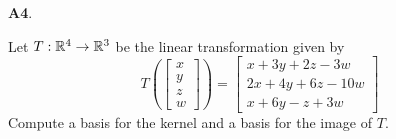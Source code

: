 \documentclass{article}
\newenvironment{problem}[1]
{
  \begin{flushleft}
  \textbf{#1}.
  \ignorespaces
}
{
  \end{flushleft}
}
\newenvironment{solution}
{
  \ignorespaces
  \textbf{Solution:}
}
{
  \ignorespacesafterend
  \begin{flushright}
  {\bfseries \qed}
  \end{flushright}
}
\begin{document}
%
\begin{problem}{A4}
Let \(T: \mathbb{R}^4 \rightarrow \mathbb{R}^3\) be the linear transformation given by
\[
  T\left(\begin{bmatrix}x\\y\\z\\w\end{bmatrix} \right) =
  \begin{bmatrix}
    x+3y+2z-3w \\
    2x+4y+6z-10w \\
    x+6y-z+3w
  \end{bmatrix}
\]
Compute a basis for the kernel and a basis for the image of \(T\).
\end{problem}
\end{document}
